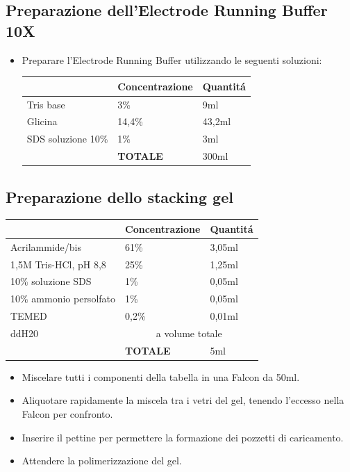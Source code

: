 \subsection{Preparazione dell'Electrode Running Buffer 10X}
\begin{itemize}
	\item Preparare l'Electrode Running Buffer utilizzando
	le seguenti soluzioni:\\
	\begin{tabular}{|l|l|l|} \hline
		& \textbf{Concentrazione} & \textbf{Quantit\'a} \\\hline
		Tris base & 3\% & 9ml \\\hline
		Glicina & 14,4\% & 43,2ml \\\hline
		SDS soluzione 10\% & 1\% & 3ml \\\hline
		& \textbf{TOTALE} & 300ml \\\hline
	\end{tabular}
\end{itemize}

\subsection{Preparazione dello stacking gel}

\begin{tabular}{|l|l|l|} \hline
	& \textbf{Concentrazione} & \textbf{Quantit\'a} \\\hline
	Acrilammide/bis & 61\% & 3,05ml \\\hline
	1,5M Tris-HCl, pH 8,8 & 25\% & 1,25ml \\\hline
	10\% soluzione SDS & 1\% & 0,05ml \\\hline
	10\% ammonio persolfato & 1\% & 0,05ml \\\hline
	TEMED & 0,2\% & 0,01ml \\\hline
	ddH20 & \multicolumn{2}{c|}{a volume totale} \\\hline
	& \textbf{TOTALE} & 5ml \\\hline
\end{tabular}

\begin{itemize}
	\item Miscelare tutti i componenti della tabella in una Falcon
	da 50ml.
	\item Aliquotare rapidamente la miscela tra i vetri del gel, tenendo
	l'eccesso nella Falcon per confronto.
	\item Inserire il pettine per permettere la formazione dei pozzetti
	di caricamento.
	\item Attendere la polimerizzazione del gel.
\end{itemize}

